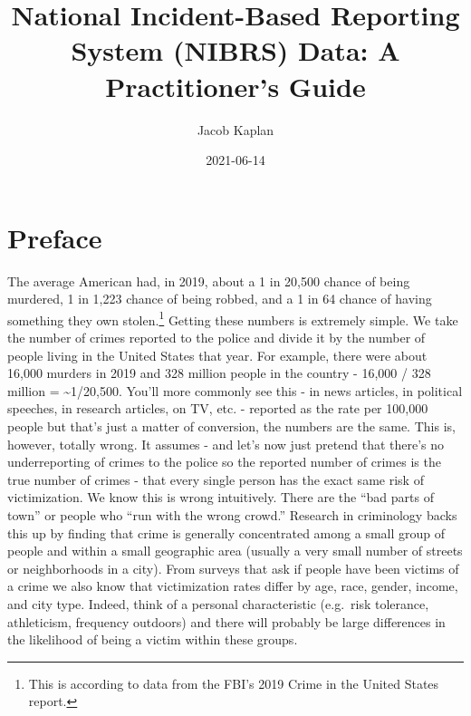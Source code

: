 \documentclass[
  12pt,
  openany]{book}
\title{National Incident-Based Reporting System (NIBRS) Data: A Practitioner's Guide}
\author{Jacob Kaplan}
\date{2021-06-14}
\begin{document}
\maketitle

{
\hypersetup{linkcolor=}
\setcounter{tocdepth}{2}
\tableofcontents
}
\listoftables
\listoffigures
{}
\hypertarget{preface}{%
\chapter{Preface}\label{preface}}

The average American had, in 2019, about a 1 in 20,500 chance of being murdered, 1 in 1,223 chance of being robbed, and a 1 in 64 chance of having something they own stolen.\footnote{This is according to data from the FBI's 2019 Crime in the United States report.} Getting these numbers is extremely simple. We take the number of crimes reported to the police and divide it by the number of people living in the United States that year. For example, there were about 16,000 murders in 2019 and 328 million people in the country - 16,000 / 328 million = \textasciitilde1/20,500. You'll more commonly see this - in news articles, in political speeches, in research articles, on TV, etc. - reported as the rate per 100,000 people but that's just a matter of conversion, the numbers are the same. This is, however, totally wrong. It assumes - and let's now just pretend that there's no underreporting of crimes to the police so the reported number of crimes is the true number of crimes - that every single person has the exact same risk of victimization. We know this is wrong intuitively. There are the ``bad parts of town'' or people who ``run with the wrong crowd.'' Research in criminology backs this up by finding that crime is generally concentrated among a small group of people and within a small geographic area (usually a very small number of streets or neighborhoods in a city). From surveys that ask if people have been victims of a crime we also know that victimization rates differ by age, race, gender, income, and city type. Indeed, think of a personal characteristic (e.g.~risk tolerance, athleticism, frequency outdoors) and there will probably be large differences in the likelihood of being a victim within these groups.
\end{document}
